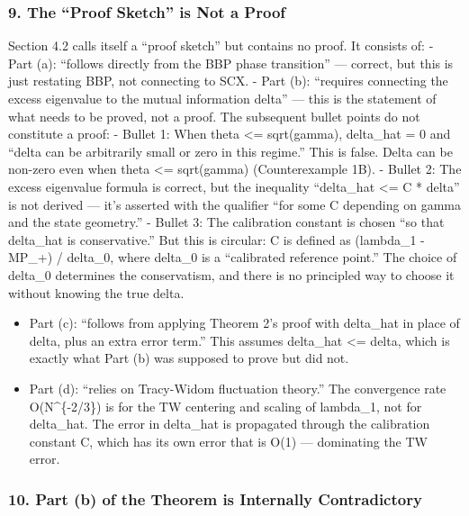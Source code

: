\documentclass[
  12pt,
]{article}
\begin{document}
\subsubsection{9. The ``Proof Sketch'' is Not a
Proof}\label{the-proof-sketch-is-not-a-proof}

Section 4.2 calls itself a ``proof sketch'' but contains no proof. It
consists of: - Part (a): ``follows directly from the BBP phase
transition'' --- correct, but this is just restating BBP, not connecting
to SCX. - Part (b): ``requires connecting the excess eigenvalue to the
mutual information delta'' --- this is the statement of what needs to be
proved, not a proof. The subsequent bullet points do not constitute a
proof: - Bullet 1: When theta \textless= sqrt(gamma), delta\_hat = 0 and
``delta can be arbitrarily small or zero in this regime.'' This is
false. Delta can be non-zero even when theta \textless= sqrt(gamma)
(Counterexample 1B). - Bullet 2: The excess eigenvalue formula is
correct, but the inequality ``delta\_hat \textless= C * delta'' is not
derived --- it's asserted with the qualifier ``for some C depending on
gamma and the state geometry.'' - Bullet 3: The calibration constant is
chosen ``so that delta\_hat is conservative.'' But this is circular: C
is defined as (lambda\_1 - MP\_+) / delta\_0, where delta\_0 is a
``calibrated reference point.'' The choice of delta\_0 determines the
conservatism, and there is no principled way to choose it without
knowing the true delta.

\begin{itemize}
\item
  Part (c): ``follows from applying Theorem 2's proof with delta\_hat in
  place of delta, plus an extra error term.'' This assumes delta\_hat
  \textless= delta, which is exactly what Part (b) was supposed to prove
  but did not.
\item
  Part (d): ``relies on Tracy-Widom fluctuation theory.'' The
  convergence rate O(N\^{}\{-2/3\}) is for the TW centering and scaling
  of lambda\_1, not for delta\_hat. The error in delta\_hat is
  propagated through the calibration constant C, which has its own error
  that is O(1) --- dominating the TW error.
\end{itemize}

\subsubsection{10. Part (b) of the Theorem is Internally
Contradictory}\label{part-b-of-the-theorem-is-internally-contradictory}
\end{document}
